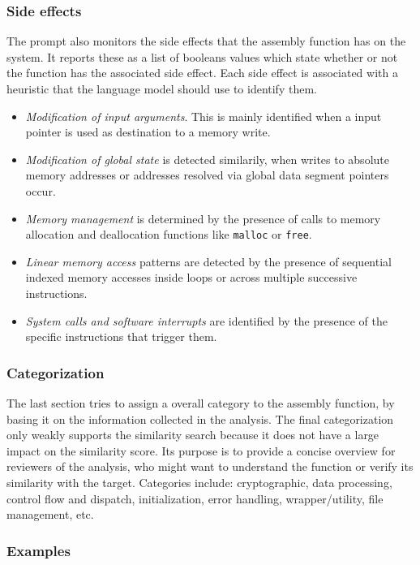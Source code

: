 \subsubsection{Side effects}

The prompt also monitors the side effects that the assembly function has on the system.
It reports these as a list of booleans values which state whether or not the function has
the associated side effect. Each side effect is associated with a heuristic that the language model
should use to identify them.

\begin{itemize}
    \item \textit{Modification of input arguments}. This is mainly identified when a input pointer is used as destination to a memory write.
    \item \textit{Modification of global state} is detected similarily, when writes to absolute memory addresses or addresses resolved via global
        data segment pointers occur.
    \item \textit{Memory management} is determined by the presence of calls to memory allocation and deallocation
        functions like \texttt{malloc} or \texttt{free}.
    \item \textit{Linear memory access} patterns are detected by the presence of sequential indexed memory accesses inside loops or
        across multiple successive instructions.
    \item \textit{System calls and software interrupts} are identified by the presence of the specific instructions that trigger them.
\end{itemize}

\subsubsection{Categorization}

The last section tries to assign a overall category to the assembly function, by basing it on the information
collected in the analysis. The final categorization only weakly supports the similarity search because it does
not have a large impact on the similarity score. Its purpose is to provide a concise overview for reviewers
of the analysis, who might want to understand the function or verify its similarity with the target.
Categories include: cryptographic, data processing, control flow and dispatch, initialization, error handling,
wrapper/utility, file management, etc.

\subsubsection{Examples}

